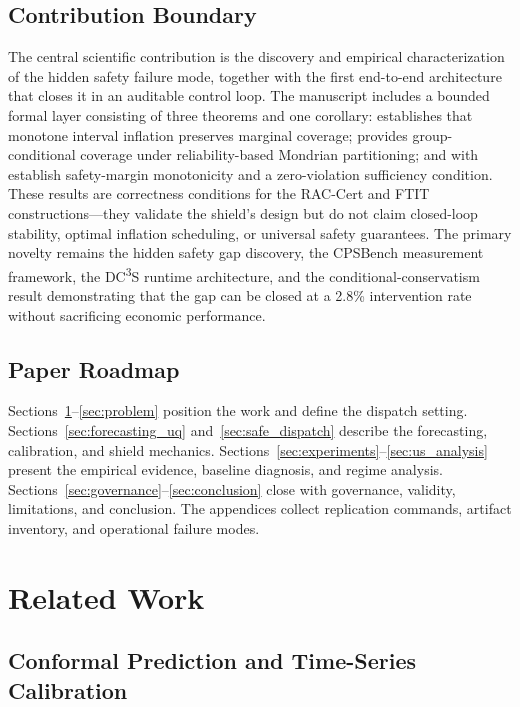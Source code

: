 \documentclass[11pt,a4paper]{article}
\begin{document}
\subsection{Contribution Boundary}

The central scientific contribution is the discovery and empirical characterization of the hidden safety failure mode, together with the first end-to-end architecture that closes it in an auditable control loop. The manuscript includes a bounded formal layer consisting of three theorems and one corollary:  establishes that monotone interval inflation preserves marginal coverage;  provides group-conditional coverage under reliability-based Mondrian partitioning; and  with  establish safety-margin monotonicity and a zero-violation sufficiency condition. These results are correctness conditions for the RAC-Cert and FTIT constructions---they validate the shield's design but do not claim closed-loop stability, optimal inflation scheduling, or universal safety guarantees. The primary novelty remains the hidden safety gap discovery, the CPSBench measurement framework, the DC\textsuperscript{3}S runtime architecture, and the conditional-conservatism result demonstrating that the gap can be closed at a 2.8\% intervention rate without sacrificing economic performance.

\subsection{Paper Roadmap}

Sections~\ref{sec:related}--\ref{sec:problem} position the work and define the dispatch setting. Sections~\ref{sec:forecasting_uq} and~\ref{sec:safe_dispatch} describe the forecasting, calibration, and shield mechanics. Sections~\ref{sec:experiments}--\ref{sec:us_analysis} present the empirical evidence, baseline diagnosis, and regime analysis. Sections~\ref{sec:governance}--\ref{sec:conclusion} close with governance, validity, limitations, and conclusion. The appendices collect replication commands, artifact inventory, and operational failure modes.

\section{Related Work}\label{sec:related}

\subsection{Conformal Prediction and Time-Series Calibration}
\end{document}
